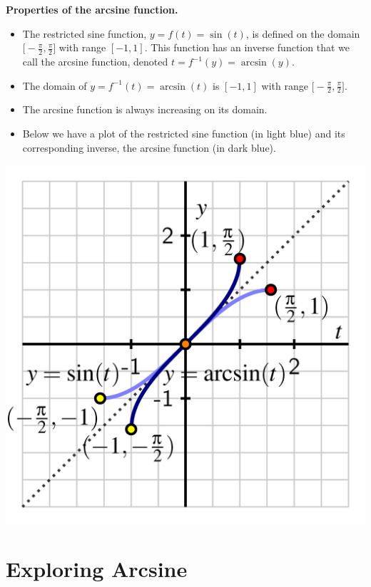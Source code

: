 \documentclass{ximera}
\begin{document}
\begin{callout}{\bf Properties of the arcsine function.}%
\begin{itemize}
\item
The restricted sine function, $y = f(t) = \sin(t)$, is defined on the domain $\Big[\!\!-\!\frac{\pi}{2},\frac{\pi}{2}\Big]$ with range $[-1,1]$.  This function has an inverse function that we call the arcsine function, denoted $t = f^{-1}(y) = \arcsin(y)$.%
\item
The domain of $y = f^{-1}(t) = \arcsin(t)$ is $[-1,1]$ with range $\Big[\!-\!\frac{\pi}{2},\frac{\pi}{2}\Big]$.%
\item
The arcsine function is always increasing on its domain.%
\item
Below we have a plot of the restricted sine function (in light blue) and its corresponding inverse, the arcsine function (in dark blue).%
\end{itemize}
\begin{image}
\includegraphics[width=0.8\linewidth]{inverse-trig-arcsin-graph.png}
\end{image}
\end{callout}

\section{Exploring Arcsine}
\end{document}
